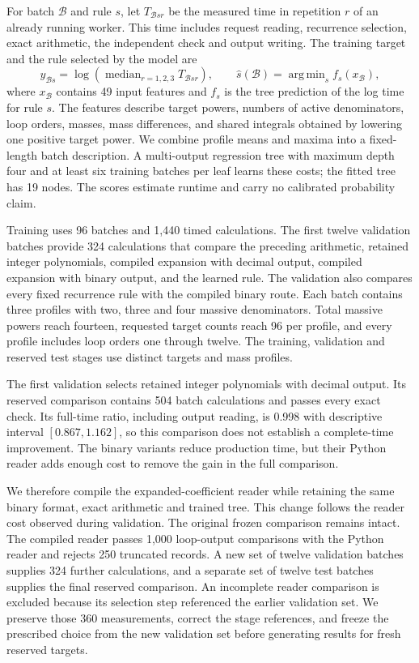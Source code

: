 For batch \(\mathcal B\) and rule \(s\), let \(T_{\mathcal B s r}\) be the
measured time in repetition \(r\) of an already running worker.
This time includes request reading, recurrence selection, exact
arithmetic, the independent check and output writing. The training
target and the rule selected by the model are
\begin{equation}
 y_{\mathcal B s}=
 \log\!\left(\operatorname{median}_{r=1,2,3}T_{\mathcal B s r}\right),
 \qquad
 \widehat s(\mathcal B)=
 \mathop{\operatorname{arg\,min}}_s f_s(x_{\mathcal B}),
 \label{eq:backend-policy}
\end{equation}
where \(x_{\mathcal B}\) contains 49 input features and \(f_s\)
is the tree prediction of the log time for rule \(s\).
The features describe target powers, numbers of active denominators,
loop orders, masses, mass differences, and shared integrals obtained by
lowering one positive target power. We combine profile means and maxima
into a fixed-length batch description. A multi-output regression tree
with maximum depth four and at least six training batches per leaf learns
these costs; the fitted tree has 19 nodes.
The scores estimate runtime and carry no calibrated probability claim.

Training uses 96 batches and 1,440 timed calculations. The first twelve validation
batches provide 324 calculations that compare the preceding
arithmetic, retained integer polynomials, compiled expansion with decimal
output, compiled expansion with binary output, and the learned rule.
The validation also compares every fixed recurrence rule with the compiled
binary route. Each batch contains three profiles with two, three and four
massive denominators. Total massive powers reach fourteen, requested
target counts reach 96 per profile, and every profile includes loop orders
one through twelve. The training, validation and reserved test stages
use distinct targets and mass profiles.

The first validation selects retained integer polynomials with decimal
output. Its reserved comparison contains 504 batch calculations and
passes every exact check. Its full-time ratio, including output reading,
is 0.998 with descriptive interval \([0.867,1.162]\), so this comparison
does not establish a complete-time improvement. The binary variants
reduce production time, but their Python reader adds enough cost to
remove the gain in the full comparison.

We therefore compile the expanded-coefficient reader while retaining the
same binary format, exact arithmetic and trained tree. This change follows
the reader cost observed during validation. The original frozen comparison
remains intact. The compiled reader passes 1,000 loop-output comparisons
with the Python reader and rejects 250 truncated records. A new set of
twelve validation batches supplies 324 further calculations, and a separate
set of twelve test batches supplies the final reserved comparison.
An incomplete reader comparison is excluded because its selection step
referenced the earlier validation set. We preserve those 360 measurements,
correct the stage references, and freeze the prescribed choice from the
new validation set before generating results for fresh reserved targets.

